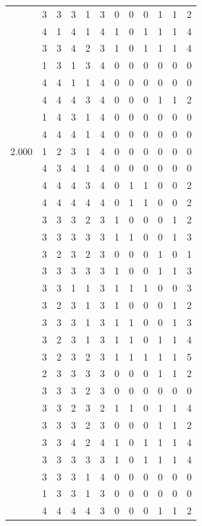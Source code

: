 \documentclass[]{book}
\theoremstyle{definition}
\theoremstyle{definition}
\theoremstyle{definition}
\theoremstyle{remark}
\begin{document}
\begin{table}
{\begin{tabular}[t]{rrrrrrrrrrrr}
 & 3 & 3 & 3 & 1 & 3 & 0 & 0 & 0 & 1 & 1 & 2\\
 & 4 & 1 & 4 & 1 & 4 & 1 & 0 & 1 & 1 & 1 & 4\\
 & 3 & 3 & 4 & 2 & 3 & 1 & 0 & 1 & 1 & 1 & 4\\
 & 1 & 3 & 1 & 3 & 4 & 0 & 0 & 0 & 0 & 0 & 0\\
 & 4 & 4 & 1 & 1 & 4 & 0 & 0 & 0 & 0 & 0 & 0\\
 & 4 & 4 & 4 & 3 & 4 & 0 & 0 & 0 & 1 & 1 & 2\\
 & 1 & 4 & 3 & 1 & 4 & 0 & 0 & 0 & 0 & 0 & 0\\
 & 4 & 4 & 4 & 1 & 4 & 0 & 0 & 0 & 0 & 0 & 0\\
2.000 & 1 & 2 & 3 & 1 & 4 & 0 & 0 & 0 & 0 & 0 & 0\\
 & 4 & 3 & 4 & 1 & 4 & 0 & 0 & 0 & 0 & 0 & 0\\
 & 4 & 4 & 4 & 3 & 4 & 0 & 1 & 1 & 0 & 0 & 2\\
 & 4 & 4 & 4 & 4 & 4 & 0 & 1 & 1 & 0 & 0 & 2\\
 & 3 & 3 & 3 & 2 & 3 & 1 & 0 & 0 & 0 & 1 & 2\\
 & 3 & 3 & 3 & 3 & 3 & 1 & 1 & 0 & 0 & 1 & 3\\
 & 3 & 2 & 3 & 2 & 3 & 0 & 0 & 0 & 1 & 0 & 1\\
 & 3 & 3 & 3 & 3 & 3 & 1 & 0 & 0 & 1 & 1 & 3\\
 & 3 & 3 & 1 & 1 & 3 & 1 & 1 & 1 & 0 & 0 & 3\\
 & 3 & 2 & 3 & 1 & 3 & 1 & 0 & 0 & 0 & 1 & 2\\
 & 3 & 3 & 3 & 1 & 3 & 1 & 1 & 0 & 0 & 1 & 3\\
 & 3 & 2 & 3 & 1 & 3 & 1 & 1 & 0 & 1 & 1 & 4\\
 & 3 & 2 & 3 & 2 & 3 & 1 & 1 & 1 & 1 & 1 & 5\\
 & 2 & 3 & 3 & 3 & 3 & 0 & 0 & 0 & 1 & 1 & 2\\
 & 3 & 3 & 3 & 2 & 3 & 0 & 0 & 0 & 0 & 0 & 0\\
 & 3 & 3 & 2 & 3 & 2 & 1 & 1 & 0 & 1 & 1 & 4\\
 & 3 & 3 & 3 & 2 & 3 & 0 & 0 & 0 & 1 & 1 & 2\\
 & 3 & 3 & 4 & 2 & 4 & 1 & 0 & 1 & 1 & 1 & 4\\
 & 3 & 3 & 3 & 3 & 3 & 1 & 0 & 1 & 1 & 1 & 4\\
 & 3 & 3 & 3 & 1 & 4 & 0 & 0 & 0 & 0 & 0 & 0\\
 & 1 & 3 & 3 & 1 & 3 & 0 & 0 & 0 & 0 & 0 & 0\\
 & 4 & 4 & 4 & 4 & 3 & 0 & 0 & 0 & 1 & 1 & 2\\

\end{tabular}}
\end{table}
\end{document}

